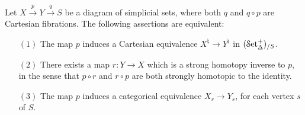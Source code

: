 \begin{proposition}\label{crispy}
Let $X \stackrel{p}{\rightarrow} Y \stackrel{q}{\rightarrow} S$ be a diagram of simplicial sets, where both $q$ and $q \circ p$ are Cartesian fibrations. The following assertions are equivalent:

\begin{itemize}
\item[$(1)$] The map $p$ induces a Cartesian equivalence $X^{\natural} \rightarrow Y^{\natural}$ in
$(\operatorname{\mathcal{S}et_{\Delta}^{+}})_{/S}$.

\item[$(2)$] There exists a map $r: Y \rightarrow X$ which is a strong homotopy inverse to $p$, in the sense that $p \circ r$ and $r \circ p$ are both strongly homotopic to the identity.

\item[$(3)$] The map $p$ induces a categorical equivalence $X_{s} \rightarrow Y_{s}$, for each vertex $s$ of $S$.
\end{itemize}
\end{proposition}

